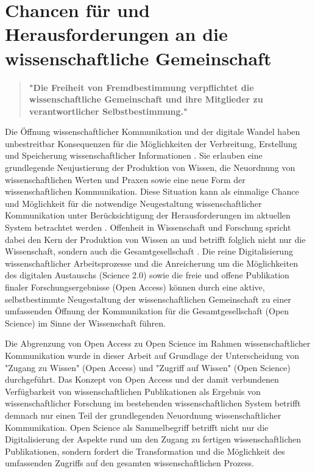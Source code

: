 \section{Chancen für und Herausforderungen an die wissenschaftliche Gemeinschaft}

\begin{quote}
\textbf{"Die Freiheit von Fremdbestimmung verpflichtet die wissenschaftliche Gemeinschaft und ihre Mitglieder zu verantwortlicher Selbstbestimmung."}
\end{quote} \cite[:69]{Oezmen_2015}

Die Öffnung wissenschaftlicher Kommunikation und der digitale Wandel haben unbestreitbar Konsequenzen für die Möglichkeiten der Verbreitung, Erstellung und Speicherung wissenschaftlicher Informationen \cite[:233]{Gould_2009}. Sie erlauben eine grundlegende Neujustierung der Produktion von Wissen, die Neuordnung von wissenschaftlichen Werten und Praxen sowie eine neue Form der wissenschaftlichen Kommunikation. Diese Situation kann als einmalige Chance und Möglichkeit für die notwendige Neugestaltung wissenschaftlicher Kommunikation unter Berücksichtigung der Herausforderungen im aktuellen System betrachtet werden \cite{Naeder_2010}. Offenheit in Wissenschaft und Forschung spricht dabei den Kern der Produktion von Wissen an und betrifft folglich nicht nur die Wissenschaft, sondern auch die Gesamtgesellschaft \cite{Mussell_2013}. Die reine Digitalisierung wissenschaftlicher Arbeitsprozesse und die Anreicherung um die Möglichkeiten des digitalen Austauschs (Science 2.0) sowie die freie und offene Publikation finaler Forschungsergebnisse (Open Access) können durch eine aktive, selbstbestimmte Neugestaltung der wissenschaftlichen Gemeinschaft zu einer umfassenden Öffnung der Kommunikation für die Gesamtgesellschaft (Open Science) im Sinne der Wissenschaft führen.

Die Abgrenzung von Open Access zu Open Science im Rahmen wissenschaftlicher Kommunikation wurde in dieser Arbeit auf Grundlage der Unterscheidung von "Zugang zu Wissen" (Open Access) und "Zugriff auf Wissen" (Open Science) durchgeführt. Das Konzept von Open Access und der damit verbundenen Verfügbarkeit von wissenschaftlichen Publikationen als Ergebnis von wissenschaftlicher Forschung im bestehenden wissenschaftlichen System betrifft demnach nur einen Teil der grundlegenden Neuordnung wissenschaftlicher Kommunikation. Open Science als Sammelbegriff betrifft nicht nur die Digitalisierung der Aspekte rund um den Zugang zu fertigen wissenschaftlichen Publikationen, sondern fordert die Transformation und die Möglichkeit des umfassenden Zugriffs auf den gesamten wissenschaftlichen Prozess.

